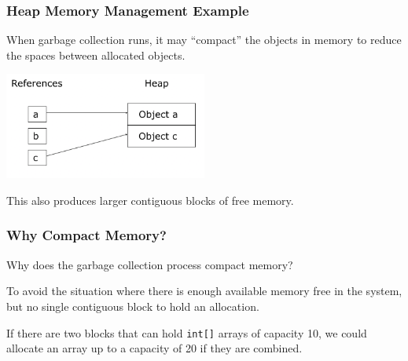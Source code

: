 \begin{frame}
\frametitle{Heap Memory Management Example}

When garbage collection runs, it may ``compact'' the objects in memory to reduce the spaces between allocated objects.

\begin{center}
\includegraphics[width=0.5\textwidth]{images/heapCompact.png}
\end{center}

This also produces larger contiguous blocks of free memory.

\end{frame}

\begin{frame}
\frametitle{Why Compact Memory?}

Why does the garbage collection process compact memory?

To avoid the situation where there is enough available memory free in the system, but no single contiguous block to hold an allocation.

If there are two blocks that can hold  \texttt{int[]} arrays of capacity 10, we could allocate an array up to a capacity of 20 if they are combined.


\end{frame}




